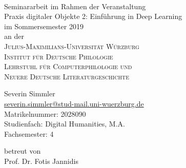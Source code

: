 \begin{titlepage}
  \vspace*{5cm}
  \makeatletter
  \begin{center}
    \begin{Huge}
      \@title
    \end{Huge}\\[0.1cm]
    \vspace{10mm}
    Seminararbeit im Rahmen der Veranstaltung\\
    Praxis digitaler Objekte 2: Einführung in Deep Learning\\
    im Sommersemester 2019\\
    an der\\
    \textsc{Julius-Maximilians-Universität Würzburg\\
            Institut für Deutsche Philologie\\
            Lehrstuhl für Computerphilologie und\\
            Neuere Deutsche Literaturgeschichte}\\
  \end{center}
  \vfill
  \begin{flushleft}
    Severin Simmler\\
    \href{mailto:severin.simmler@stud-mail.uni-wuerzburg.de}{severin.simmler@stud-mail.uni-wuerzburg.de}\\
    Matrikelnummer: 2028090\\
    Studienfach: Digital Humanities, M.A.\\
    Fachsemester: 4
  \end{flushleft}
  \vspace{3mm}
  \begin{flushleft}
    betreut von\\
    Prof. Dr. Fotis Jannidis
  \end{flushleft}
\end{titlepage}

\newpage
\null
\thispagestyle{empty}
\newpage
